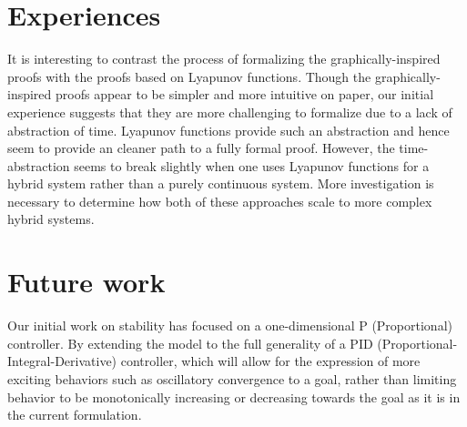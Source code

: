 \documentclass[preprint,nocopyrightspace]{sigplanconf}
\begin{document}
\section {Experiences}

It is interesting to contrast the process of formalizing the graphically-inspired proofs with the proofs based on Lyapunov functions.
Though the graphically-inspired proofs appear to be simpler and more intuitive on paper, our initial experience suggests that they are more challenging to formalize due to a lack of abstraction of time.
Lyapunov functions provide such an abstraction and hence seem to provide an cleaner path to a fully formal proof.
However, the time-abstraction seems to break slightly when one uses Lyapunov functions for a hybrid system rather than a purely continuous system.
More investigation is necessary to determine how both of these approaches scale to more complex hybrid systems.








\section{Future work}

Our initial work on stability has focused on a one-dimensional P (Proportional) controller. By extending the model to the full generality of a PID (Proportional-Integral-Derivative) controller, which will allow for the expression of more exciting behaviors such as oscillatory convergence to a goal, rather than limiting behavior to be monotonically increasing or decreasing towards the goal as it is in the current formulation.
\end{document}
